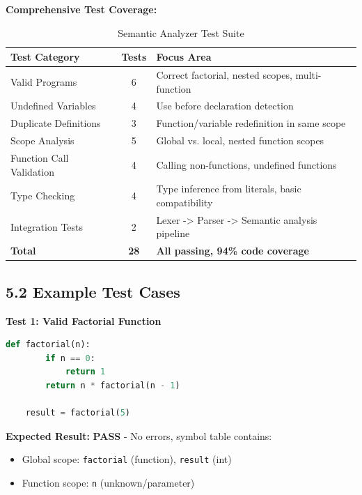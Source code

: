 \documentclass[a4paper,11pt]{article}
\newcommand{\statusgood}[1]{\colorbox{green!20}{\textbf{#1}}}
\begin{document}
    \textbf{Comprehensive Test Coverage:}

    \begin{table}[h]
    \centering
    \begin{tabularx}{\textwidth}{|l|c|X|}
    \hline
    \rowcolor{blue!10}
    \textbf{Test Category} & \textbf{Tests} & \textbf{Focus Area} \\
    \hline
    Valid Programs & 6 & Correct factorial, nested scopes, multi-function \\
    \hline
    Undefined Variables & 4 & Use before declaration detection \\
    \hline
    Duplicate Definitions & 3 & Function/variable redefinition in same scope \\
    \hline
    Scope Analysis & 5 & Global vs. local, nested function scopes \\
    \hline
    Function Call Validation & 4 & Calling non-functions, undefined functions \\
    \hline
    Type Checking & 4 & Type inference from literals, basic compatibility \\
    \hline
    Integration Tests & 2 & Lexer -> Parser -> Semantic analysis pipeline \\
    \hline
    \textbf{Total} & \textbf{28} & \textbf{All passing, 94\% code coverage} \\
    \hline
    \end{tabularx}
    \caption{Semantic Analyzer Test Suite}
    \end{table}

    \subsection{5.2 Example Test Cases}

    \textbf{Test 1: Valid Factorial Function}

    \begin{lstlisting}[language=Python, caption=Valid Program Test]
    def factorial(n):
        if n == 0:
            return 1
        return n * factorial(n - 1)

    result = factorial(5)
    \end{lstlisting}

    \textbf{Expected Result:} \statusgood{PASS} - No errors, symbol table contains:
    \begin{itemize}[leftmargin=*]
        \item Global scope: \texttt{factorial} (function), \texttt{result} (int)
        \item Function scope: \texttt{n} (unknown/parameter)
    \end{itemize}
\end{document}
